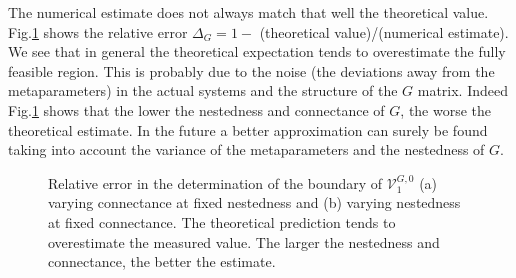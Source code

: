 \documentclass[12pt, titlepage]{report}
\begin{document}
The numerical estimate does not always match that well the theoretical value. Fig.\ref{fig: deviation away from theory feasibility} shows the relative error $\Delta_G = 1 -$ (theoretical value)/(numerical estimate). We see that in general the theoretical expectation tends to overestimate the fully feasible region. This is probably due to the noise (\ie the deviations away from the metaparameters) in the actual systems and the structure of the $G$ matrix. Indeed Fig.\ref{fig: deviation away from theory feasibility} shows that the lower the nestedness and connectance of $G$, the worse the theoretical estimate. In the future a better approximation can surely be found taking into account the variance of the metaparameters and the nestedness of $G$.
\begin{figure}[h!]
	\captionsetup[subfigure]{captionskip = -165pt, margin = 45pt}
\captionsetup[subfigure]{captionskip = -175pt, margin = 45pt}
\caption{Relative error in the determination of the boundary of $\mathcal{V}^{G,0}_1$ (a) varying connectance at fixed nestedness and (b) varying nestedness at fixed connectance. The theoretical prediction tends to overestimate the measured value. The larger the nestedness and connectance, the better the estimate.}\label{fig: deviation away from theory feasibility}
\end{figure}
\end{document}
